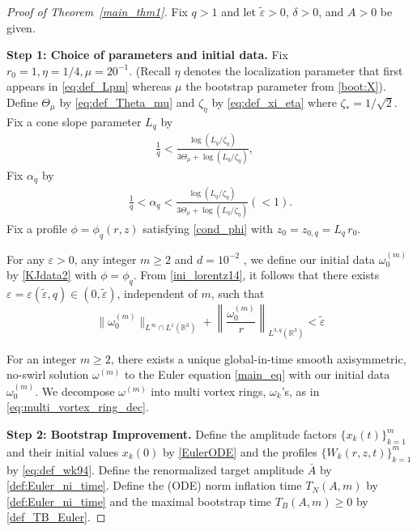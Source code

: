 \documentclass[reqno,11pt]{amsart}
\begin{document}
\begin{proof}[Proof of Theorem~\ref{main_thm1}]
Fix $q>1$ and let $\widetilde\varepsilon>0$, $\delta>0$, and $A>0$ be given.

\medskip
\noindent
\textbf{Step 1: Choice of parameters and initial data.}
Fix $r_0=1, \eta=1/4, \mu=20^{-1}. $ (Recall $\eta$ denotes the localization parameter that first appears in \eqref{eq:def_Lpm} whereas $\mu$  the bootstrap parameter from \eqref{boot:X}). 
Define $\Theta_\mu$ by \eqref{eq:def_Theta_mu} and $\zeta_\eta$ by
\eqref{eq:def_xi_eta} where $\zeta_*=1/\sqrt{2}$. 
Fix a cone slope parameter $L_q$  by
\begin{align*}
    \frac{1}{q} < \frac{\log (L_q/\zeta_\eta )}{3\Theta _\mu + \log (L_q/\zeta_\eta)}, 
    \quad 
\end{align*}
Fix $\alpha_q$ by
    \begin{align}
    \label{cond_alpha66}
        \frac{1}{q}<\alpha_q < \frac{\log (L_q/\zeta_\eta)}{3\Theta _\mu + \log (L_q/\zeta_\eta)}(<1).
    \end{align}
Fix a profile $\phi=\phi_q(r,z)$ satisfying \eqref{cond_phi} with $z_0=z_{0,q}= L_q\, r_0$. 

For any $\varepsilon>0$, any integer $m\geq 2$ and $d=10^{-2}$ , we define our initial data $\omega_0^{(m)}$ by \eqref{KJdata2} with $\phi=\phi_q$. From \eqref{ini_lorentz14}, it follows that there exists $\varepsilon=\varepsilon( \tilde \varepsilon,q)\in (0,\tilde \varepsilon)$, independent of $m$, such that
\[
\|\omega_0^{(m)}\|_{L^\infty\cap L^{1}(\mathbb R^3)}
+\left\|\frac{\omega_0^{(m)}}{r}\right\|_{L^{3,q}(\mathbb R^3)}
<\widetilde\varepsilon
\]

For an integer $m\ge 2$, there exists a unique global-in-time smooth axisymmetric, no-swirl solution $\omega^{(m)}$ to the Euler equation \eqref{main_eq} with our initial data $\omega_0^{(m)}$. We decompose $\omega^{(m)}$ into multi vortex rings, $\omega_k$'s, as in \eqref{eq:multi_vortex_ring_dec}. 



\medskip
\noindent \textbf{Step 2: Bootstrap Improvement.}
Define the amplitude factors $\{x_k(t)\}_{k=1}^m$ and their initial values $x_k(0)$ by \eqref{EulerODE} and the profiles $\{W_k(r,z,t)\}_{k=1}^m$ by  \eqref{eq:def_wk94}. Define the renormalized target amplitude $\bar A$ by \eqref{def:Euler_ni_time}. 
Define the (ODE) norm inflation time $T_N(A,m)$ by \eqref{def:Euler_ni_time} and the maximal bootstrap time $T_B(A,m)\geq 0$ by \eqref{def_TB_Euler}. 


\end{proof}
\end{document}
